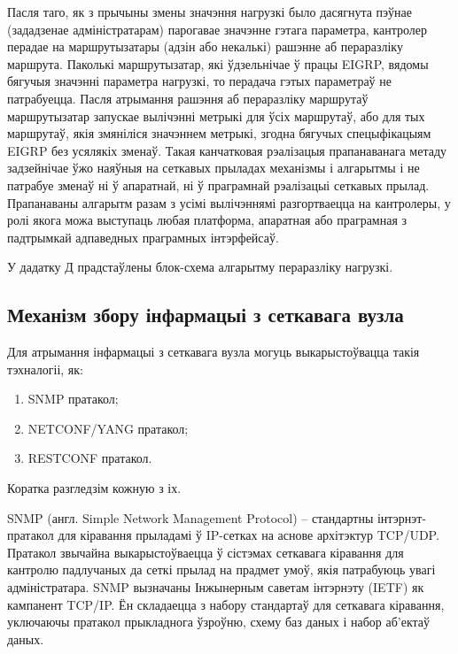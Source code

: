Пасля таго, як з прычыны змены значэння нагрузкі было дасягнута пэўнае (зададзенае адміністратарам) парогавае значэнне гэтага параметра, кантролер перадае на маршрутызатары (адзін або некалькі) рашэнне
аб пераразліку маршрута. Паколькі маршрутызатар, які ўдзельнічае ў працы
EIGRP, вядомы бягучыя значэнні параметра нагрузкі, то перадача гэтых параметраў не патрабуецца. Пасля атрымання рашэння аб пераразліку маршрутаў
маршрутызатар запускае вылічэнні метрыкі для ўсіх маршрутаў, або для тых
маршрутаў, якія змяніліся значэннем метрыкі, згодна
бягучых спецыфікацыям EIGRP без усялякіх зменаў. Такая канчатковая рэалізацыя прапанаванага метаду задзейнічае ўжо наяўныя на сеткавых прыладах механізмы і алгарытмы і не патрабуе зменаў ні ў апаратнай, ні
ў праграмнай рэалізацыі сеткавых прылад. Прапанаваны алгарытм разам
з усімі вылічэннямі разгортваецца на кантролеры, у ролі якога можа
выступаць любая платформа, апаратная або праграмная з падтрымкай адпаведных праграмных інтэрфейсаў.

У дадатку Д прадстаўлены блок-схема алгарытму пераразліку нагрузкі.



\subsection{Механізм збору інфармацыі з сеткавага вузла}

Для атрымання інфармацыі з сеткавага вузла могуць выкарыстоўвацца такія тэхналогіі, як:
\begin{enumerate}
    \item SNMP пратакол;
    \item NETCONF/YANG пратакол;
    \item RESTCONF пратакол.
\end{enumerate}

Коратка разгледзім кожную з іх.

SNMP (англ. Simple Network Management Protocol) -- стандартны інтэрнэт-пратакол для кіравання прыладамі ў IP-сетках на аснове архітэктур TCP/UDP. Пратакол звычайна выкарыстоўваецца ў сістэмах сеткавага кіравання для кантролю падлучаных да сеткі прылад на прадмет умоў, якія патрабуюць увагі адміністратара. SNMP вызначаны Інжынерным саветам інтэрнэту (IETF) як кампанент TCP/IP. Ён складаецца з набору стандартаў для сеткавага кіравання, уключаючы пратакол прыкладнога ўзроўню, схему баз даных і набор аб'ектаў даных.

